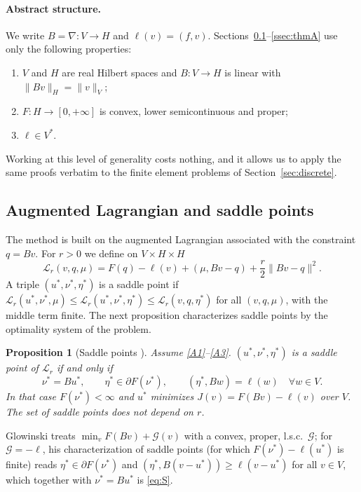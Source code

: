 \documentclass[11pt]{amsart}
\newtheorem{proposition}[theorem]{Proposition}
\theoremstyle{definition}
\theoremstyle{remark}
\numberwithin{equation}{section}
\newcommand{\Lag}{\mathcal{L}_r}
\newcommand{\norm}[1]{\lVert #1\rVert}
\begin{document}
\paragraph{Abstract structure.} We write $B=\nabla\colon V\to H$ and $\ell(v)=(f,v)$. Sections~\ref{ssec:saddle}--\ref{ssec:thmA} use only the following properties:
\begin{enumerate}[label=(A\arabic*),leftmargin=2.8em]
\item\label{A1} $V$ and $H$ are real Hilbert spaces and $B\colon V\to H$ is linear with $\norm{Bv}_H=\norm v_V$;
\item\label{A2} $F\colon H\to[0,+\infty]$ is convex, lower semicontinuous and proper;
\item\label{A3} $\ell\in V^*$.
\end{enumerate}
Working at this level of generality costs nothing, and it allows us to apply the same proofs verbatim to the finite element problems of Section~\ref{sec:discrete}.

\subsection{Augmented Lagrangian and saddle points}\label{ssec:saddle}
The method is built on the augmented Lagrangian associated with the constraint $q=Bv$. For $r>0$ we define on $V\times H\times H$
\[
\Lag(v,q,\mu)=F(q)-\ell(v)+(\mu,Bv-q)+\frac r2\norm{Bv-q}^2 .
\]
A triple $(u^*,\nu^*,\eta^*)$ is a saddle point if $\Lag(u^*,\nu^*,\mu)\le\Lag(u^*,\nu^*,\eta^*)\le\Lag(v,q,\eta^*)$ for all $(v,q,\mu)$, with the middle term finite. The next proposition characterizes saddle points by the optimality system of the problem.

\begin{proposition}[Saddle points {\cite[Ch.~VI, Thm.~2.1]{Glowinski1984ChVI}}]\label{prop:saddle}
Assume \ref{A1}--\ref{A3}. $(u^*,\nu^*,\eta^*)$ is a saddle point of $\Lag$ if and only if
\begin{equation}\label{eq:S}
\nu^*=Bu^*,\qquad \eta^*\in\partial F(\nu^*),\qquad (\eta^*,Bw)=\ell(w)\quad\forall w\in V .
\end{equation}
In that case $F(\nu^*)<\infty$ and $u^*$ minimizes $J(v)=F(Bv)-\ell(v)$ over $V$. The set of saddle points does not depend on $r$.
\end{proposition}
Glowinski treats $\min_vF(Bv)+\mathcal G(v)$ with a convex, proper, l.s.c.\ $\mathcal G$; for $\mathcal G=-\ell$, his characterization \cite[Ch.~VI, (2.11)--(2.12)]{Glowinski1984ChVI} of saddle points (for which $F(\nu^*)-\ell(u^*)$ is finite) reads $\eta^*\in\partial F(\nu^*)$ and $(\eta^*,B(v-u^*))\ge\ell(v-u^*)$ for all $v\in V$, which together with $\nu^*=Bu^*$ is \eqref{eq:S}.
\end{document}
